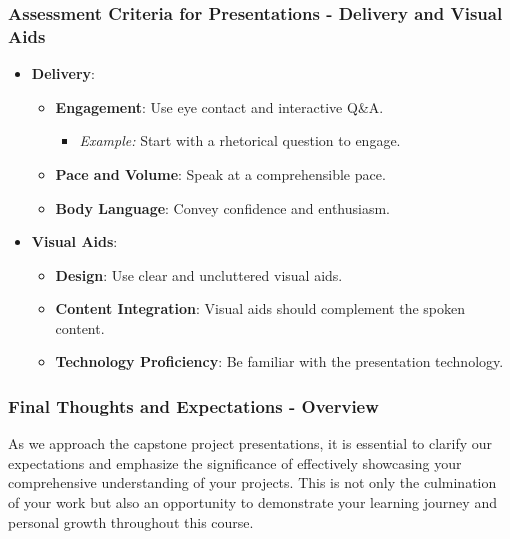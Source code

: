 \documentclass[aspectratio=169]{beamer}
\begin{document}
\begin{frame}[fragile]
    \frametitle{Assessment Criteria for Presentations - Delivery and Visual Aids}
    \begin{itemize}
        \item \textbf{Delivery}:
            \begin{itemize}
                \item \textbf{Engagement}: Use eye contact and interactive Q&A.
                    \begin{itemize}
                        \item \textit{Example:} Start with a rhetorical question to engage.
                    \end{itemize}
                \item \textbf{Pace and Volume}: Speak at a comprehensible pace.
                \item \textbf{Body Language}: Convey confidence and enthusiasm.
            \end{itemize}
        
        \item \textbf{Visual Aids}:
            \begin{itemize}
                \item \textbf{Design}: Use clear and uncluttered visual aids.
                \item \textbf{Content Integration}: Visual aids should complement the spoken content.
                \item \textbf{Technology Proficiency}: Be familiar with the presentation technology.
            \end{itemize}
    \end{itemize}
\end{frame}

\begin{frame}[fragile]
    \frametitle{Final Thoughts and Expectations - Overview}
    As we approach the capstone project presentations, it is essential to clarify our expectations and emphasize the significance of effectively showcasing your comprehensive understanding of your projects. 
    This is not only the culmination of your work but also an opportunity to demonstrate your learning journey and personal growth throughout this course.
\end{frame}
\end{document}
